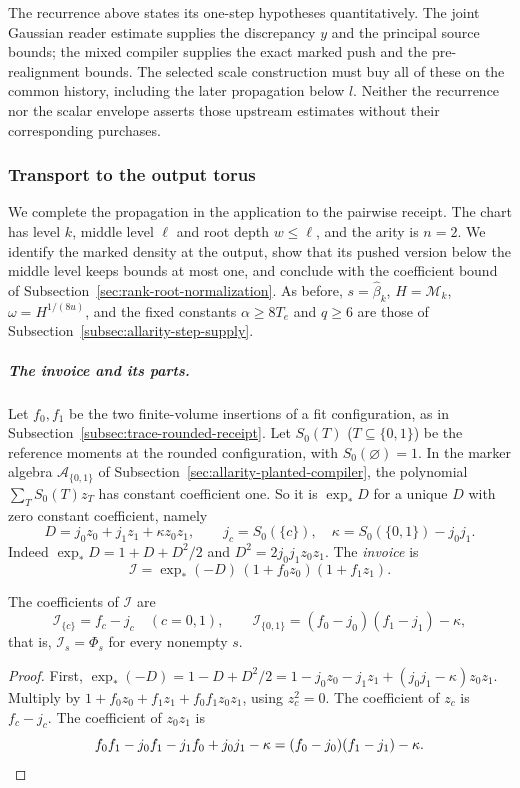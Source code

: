 The recurrence above states its one-step hypotheses quantitatively.
The joint Gaussian reader estimate supplies the discrepancy $y$ and
the principal source bounds; the mixed compiler supplies the exact
marked push and the pre-realignment bounds. The selected scale
construction must buy all of these on the common history, including
the later propagation below $l$. Neither the recurrence nor the
scalar envelope asserts those upstream estimates without their
corresponding purchases.

\subsubsection{Transport to the output torus}
\label{subsec:allarity-output-transport}

We complete the propagation in the application to the pairwise receipt.
The chart has level $k$, middle level $\ell$ and root depth $w\le\ell$, and
the arity is $n=2$. We identify the marked density at the output, show
that its pushed version below the middle level keeps bounds at most one,
and conclude with the coefficient bound of
Subsection~\ref{sec:rank-root-normalization}. As before, $s=\widehat\beta_k$,
$H=\mathcal M_k$, $\omega=H^{1/(8u)}$, and the fixed constants
$\alpha\ge8T_e$ and $q\ge6$ are those of
Subsection~\ref{subsec:allarity-step-supply}.

\subparagraph{The invoice and its parts.}
Let $f_0,f_1$ be the two finite-volume insertions of a fit configuration,
as in Subsection~\ref{subsec:trace-rounded-receipt}. Let $S_0(T)$
($T\subseteq\{0,1\}$) be the reference moments at the rounded
configuration, with $S_0(\varnothing)=1$. In the marker algebra
$\mathscr A_{\{0,1\}}$ of Subsection~\ref{sec:allarity-planted-compiler},
the polynomial $\sum_TS_0(T)z_T$ has constant coefficient one. So it is
$\exp_*D$ for a unique $D$ with zero constant coefficient, namely
\[
 D=j_0z_0+j_1z_1+\kappa z_0z_1,\qquad
 j_c=S_0(\{c\}),\quad\kappa=S_0(\{0,1\})-j_0j_1 .
\]
Indeed $\exp_*D=1+D+D^2/2$ and $D^2=2j_0j_1z_0z_1$. The \emph{invoice} is
\[
 \mathcal I=\exp_*(-D)\,(1+f_0z_0)(1+f_1z_1).
\]

\begin{lemma}\label{lem:allarity-invoice-parts}
The coefficients of $\mathcal I$ are
\[
 \mathcal I_{\{c\}}=f_c-j_c\quad(c=0,1),\qquad
 \mathcal I_{\{0,1\}}=(f_0-j_0)(f_1-j_1)-\kappa ,
\]
that is, $\mathcal I_s=\Phi_s$ for every nonempty $s$.
\end{lemma}
\begin{proof}
First,
$\exp_*(-D)=1-D+D^2/2=1-j_0z_0-j_1z_1+(j_0j_1-\kappa)z_0z_1$.
Multiply by $1+f_0z_0+f_1z_1+f_0f_1z_0z_1$, using $z_c^2=0$. The
coefficient of $z_c$ is $f_c-j_c$. The coefficient of $z_0z_1$ is
\[
 f_0f_1-j_0f_1-j_1f_0+j_0j_1-\kappa
 =(f_0-j_0)(f_1-j_1)-\kappa .\qedhere
\]
\end{proof}

